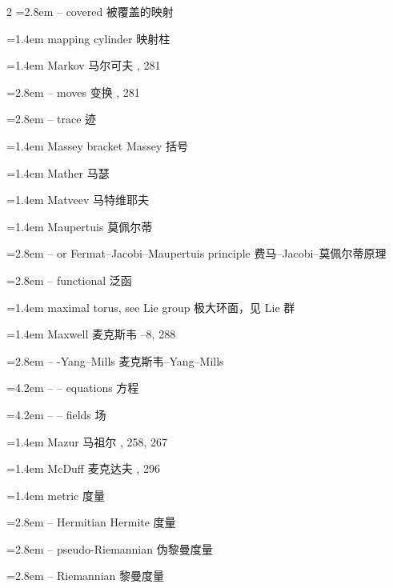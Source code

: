 \begin{multicols}{2}
\noindent\hangindent=2.8em -- covered \quad 被覆盖的映射 \par
\noindent\hangindent=1.4em mapping cylinder \quad 映射柱 \par
\noindent\hangindent=1.4em Markov \quad 马尔可夫 , 281\par
\noindent\hangindent=2.8em -- moves \quad 变换 , 281\par
\noindent\hangindent=2.8em -- trace \quad 迹 \par
\noindent\hangindent=1.4em Massey bracket \quad Massey 括号 \par
\noindent\hangindent=1.4em Mather \quad 马瑟 \par
\noindent\hangindent=1.4em Matveev \quad 马特维耶夫 \par
\noindent\hangindent=1.4em Maupertuis \quad 莫佩尔蒂 \quad\par
\noindent\hangindent=2.8em -- or Fermat--Jacobi--Maupertuis principle \quad 费马--Jacobi--莫佩尔蒂原理 \par
\noindent\hangindent=2.8em -- functional \quad 泛函 \par
\noindent\hangindent=1.4em maximal torus, see Lie group \quad 极大环面，见 Lie 群 \quad\par
\noindent\hangindent=1.4em Maxwell \quad 麦克斯韦 --8, 288\par
\noindent\hangindent=2.8em -- -Yang--Mills \quad 麦克斯韦--Yang--Mills \quad\par
\noindent\hangindent=4.2em -- -- equations \quad 方程 \par
\noindent\hangindent=4.2em -- -- fields \quad 场 \par
\noindent\hangindent=1.4em Mazur \quad 马祖尔 , 258, 267\par
\noindent\hangindent=1.4em McDuff \quad 麦克达夫 , 296\par
\noindent\hangindent=1.4em metric \quad 度量 \quad\par
\noindent\hangindent=2.8em -- Hermitian \quad Hermite 度量 \par
\noindent\hangindent=2.8em -- pseudo-Riemannian \quad 伪黎曼度量 \par
\noindent\hangindent=2.8em -- Riemannian \quad 黎曼度量 \par

\end{multicols}
